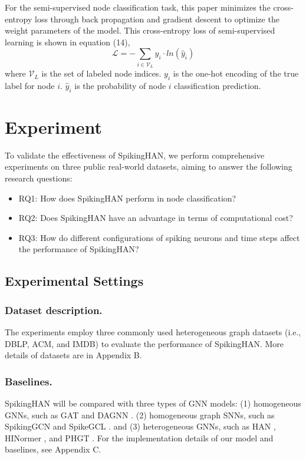 \documentclass[letterpaper]{article} %
\begin{document}
For the semi-supervised node classification task, this paper minimizes the cross-entropy loss through back propagation and gradient descent to optimize the weight parameters of the model. This cross-entropy loss of semi-supervised learning is shown in equation (14), 
\begin{equation}
\mathcal{L}=-\sum_{i\in\mathcal{V}_L} y_i\cdot ln\left({\hat{y}}_i\right)
\label{eq14}
\end{equation}
where $\mathcal{V}_L$ is the set of labeled node indices. $y_i$ is the one-hot encoding of the true label for node $i$. ${\hat{y}}_i$ is the probability of node $i$ classification prediction.

\section{Experiment}
To validate the effectiveness of SpikingHAN, we perform comprehensive experiments on three public real-world datasets, aiming to answer the following research questions: 
\begin{itemize}
    \item RQ1: How does SpikingHAN perform in node classification?
    \item RQ2: Does SpikingHAN have an advantage in terms of computational cost?
    \item RQ3: How do different configurations of spiking neurons and time steps affect the performance of SpikingHAN?
\end{itemize}

\subsection{Experimental Settings}
\subsubsection{Dataset description.}The experiments employ three commonly used heterogeneous graph datasets (i.e., DBLP, ACM, and IMDB) to evaluate the performance of SpikingHAN. More details of datasets are in Appendix B.

\subsubsection{Baselines.}SpikingHAN will be compared with three types of GNN models: (1) homogeneous GNNs, such as GAT \cite{bib36} and DAGNN \cite{bib37}. (2) homogeneous graph SNNs, such as SpikingGCN \cite{bib15} and SpikeGCL \cite{bib16}. and (3) heterogeneous GNNs, such as  HAN \cite{bib10} , HINormer \cite{bib38}, and PHGT \cite{bib21}. For the implementation details of our model and baselines, see Appendix C.
\end{document}
